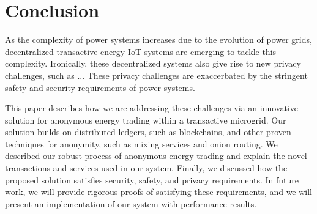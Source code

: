 \section{Conclusion}
\label{sec:concl}


As the complexity of power systems increases due to the evolution of
power grids, decentralized transactive-energy IoT systems are emerging
to tackle this complexity.  Ironically, these decentralized systems
also give rise to new privacy challenges, such as ...
These privacy challenges are exaccerbated by the stringent safety and
security requirements of power systems.

This paper describes how we are addressing these challenges via an
innovative solution for anonymous energy trading within a transactive
microgrid.  Our solution builds on distributed ledgers, such as
blockchains, and other proven techniques for anonymity, such as mixing
services and onion routing.  We described our robust process of
anonymous energy trading and explain the novel transactions and
services used in our system.  Finally, we discussed how the proposed
solution satisfies security, safety, and privacy requirements.  In
future work, we will provide rigorous proofs of satisfying these
requirements, and we will present an implementation of our system with
performance results.

